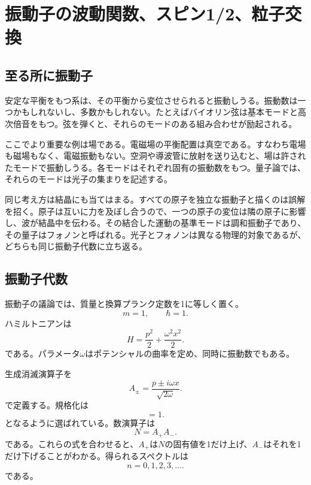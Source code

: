 \chapter{振動子の波動関数、スピン1/2、粒子交換}

\section{至る所に振動子}

安定な平衡をもつ系は、その平衡から変位させられると振動しうる。振動数は一つかもしれないし、多数かもしれない。たとえばバイオリン弦は基本モードと高次倍音をもつ。弦を弾くと、それらのモードのある組み合わせが励起される。

ここでより重要な例は場である。電磁場の平衡配置は真空である。すなわち電場も磁場もなく、電磁振動もない。空洞や導波管に放射を送り込むと、場は許されたモードで振動しうる。各モードはそれぞれ固有の振動数をもつ。量子論では、それらのモードは光子の集まりを記述する。

同じ考え方は結晶にも当てはまる。すべての原子を独立な振動子と描くのは誤解を招く。原子は互いに力を及ぼし合うので、一つの原子の変位は隣の原子に影響し、波が結晶中を伝わる。その結合した運動の基準モードは調和振動子であり、その量子はフォノンと呼ばれる。光子とフォノンは異なる物理的対象であるが、どちらも同じ振動子代数に立ち返る。

\section{振動子代数}

振動子の議論では、質量と換算プランク定数を1に等しく置く。
\[
m=1,\qquad \hbar=1.
\]
ハミルトニアンは
\begin{equation}
H=\frac{p^{2}}{2}+\frac{\omega^{2}x^{2}}{2}.
\end{equation}
である。パラメータ\(\omega\)はポテンシャルの曲率を定め、同時に振動数でもある。

生成消滅演算子を
\begin{equation}
A_{\pm}=\frac{p\pm i\omega x}{\sqrt{2\omega}}.
\end{equation}
で定義する。規格化は
\begin{equation}
[A_{-},A_{+}]=1.
\end{equation}
となるように選ばれている。数演算子は
\begin{equation}
N=A_{+}A_{-}.
\end{equation}
である。これらの式を合わせると、\(A_{+}\)は\(N\)の固有値を1だけ上げ、\(A_{-}\)はそれを1だけ下げることがわかる。得られるスペクトルは
\begin{equation}
n=0,1,2,3,\ldots .
\end{equation}
である。

